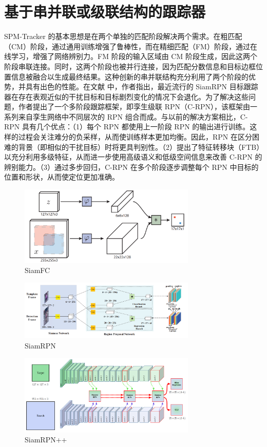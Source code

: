 \section{基于串并联或级联结构的跟踪器}
SPM-Tracker \cite{SPM} 的基本思想是在两个单独的匹配阶段解决两个需求。在粗匹配（CM）阶段，通过通用训练增强了鲁棒性，而在精细匹配（FM）阶段，通过在线学习，增强了网络辨别力。FM 阶段的输入区域由 CM 阶段生成，因此这两个阶段串联连接。同时，这两个阶段也被并行连接，因为匹配分数信息和目标边框位置信息被融合以生成最终结果。这种创新的串并联结构充分利用了两个阶段的优势，并具有出色的性能。在文献 \cite{fan2019siamese} 中，作者指出，最近流行的 SiamRPN \cite{SiamRPN} 目标跟踪器在存在表观近似的干扰目标和目标剧烈变化的情况下会退化。为了解决这些问题，作者提出了一个多阶段跟踪框架，即孪生级联 RPN（C-RPN），该框架由一系列来自孪生网络中不同层次的 RPN 组合而成。与以前的解决方案相比，C-RPN 具有几个优点：（1）每个 RPN 都使用上一阶段 RPN 的输出进行训练。这样的过程会关注难分的负采样，从而使训练样本更加均衡。因此，RPN 在区分困难的背景（即相似的干扰目标）时将更具判别性。（2）提出了特征转移块（FTB）以充分利用多级特征，从而进一步使用高级语义和低级空间信息来改善 C-RPN 的辨别能力。（3）通过多步回归，C-RPN 在多个阶段逐步调整每个 RPN 中目标的位置和形状，从而使定位更加准确。
\iffalse
\begin{figure}
\centering
\includegraphics[width=0.75\textwidth]{Img/related/SiamFC.png}
\caption{SiamFC}
\end{figure}

\begin{figure}
\centering
\includegraphics[width=0.75\textwidth]{Img/related/SiamRPN.png}
\caption{SiamRPN}
\end{figure}

\begin{figure}
\centering
\includegraphics[width=0.75\textwidth]{Img/related/SiamRPN++.png}
\caption{SiamRPN++}
\end{figure}

